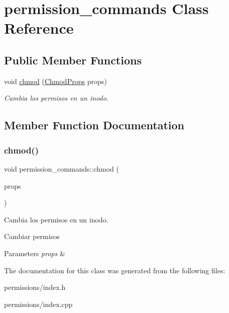 \hypertarget{classpermission__commands}{}\section{permission\+\_\+commands Class Reference}
\label{classpermission__commands}
\subsection*{Public Member Functions}
\begin{DoxyCompactItemize}
\item 
void \hyperlink{classpermission__commands_a6b32b3c7392b6d4c21cf8f7e9b8bf128}{chmod} (\hyperlink{structChmodProps}{Chmod\+Props} props)
\begin{DoxyCompactList}\small\item\em Cambia los permisos en un inodo. \end{DoxyCompactList}\end{DoxyCompactItemize}


\subsection{Member Function Documentation}
\mbox{\label{classpermission__commands_a6b32b3c7392b6d4c21cf8f7e9b8bf128}} 
\subsubsection{\texorpdfstring{chmod()}{chmod()}}
{\footnotesize\ttfamily void permission\+\_\+commands\+::chmod (\begin{DoxyParamCaption}\item[{\hyperlink{structChmodProps}{Chmod\+Props}}]{props }\end{DoxyParamCaption})}



Cambia los permisos en un inodo. 

Cambiar permisos 
\begin{DoxyParams}{Parameters}
{\em props} & \\
\hline
\end{DoxyParams}


The documentation for this class was generated from the following files\+:\begin{DoxyCompactItemize}
\item 
permissions/index.\+h\item 
permissions/index.\+cpp\end{DoxyCompactItemize}
